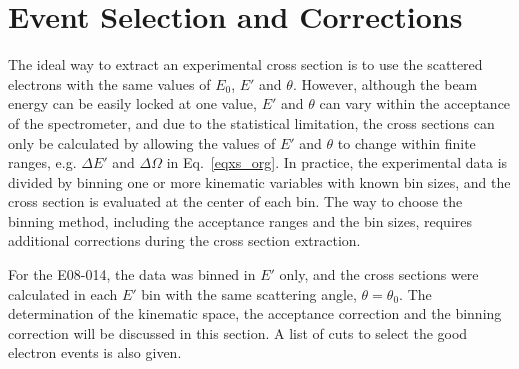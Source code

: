 \section{Event Selection and Corrections}
  The ideal way to extract an experimental cross section is to use the scattered electrons with the same values of $E_{0}$, $E'$ and $\theta$. However, although the beam energy can be easily locked at one value, $E'$ and $\theta$ can vary within the acceptance of the spectrometer, and due to the statistical limitation, the cross sections can only be calculated by allowing the values of $E'$ and $\theta$ to change within finite ranges, e.g. $\Delta E'$ and $\Delta\Omega$ in Eq.~\eqref{eqxs_org}. In practice, the experimental data is divided by binning one or more kinematic variables with known bin sizes, and the cross section is evaluated at the center of each bin. The way to choose the binning method, including the acceptance ranges and the bin sizes, requires additional corrections during the cross section extraction.
   
   For the E08-014, the data was binned in $E'$ only, and the cross sections were calculated in each $E'$ bin with the same scattering angle, $\theta=\theta_{0}$. The determination of the kinematic space, the acceptance correction and the binning correction will be discussed in this section. A list of cuts to select the good electron events is also given.  
  
